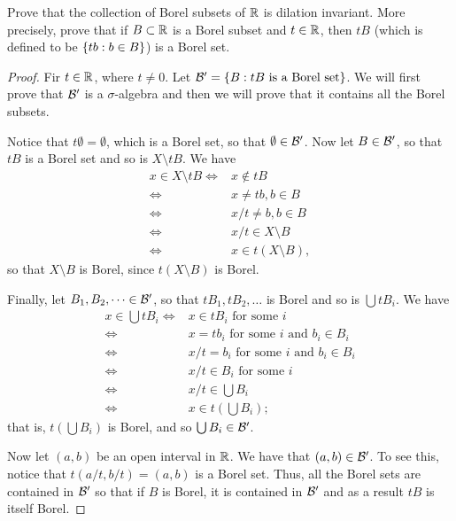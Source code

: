 \begin{exercise}{8}
Prove that the collection of Borel subsets of $\mathbb{R}$ is dilation invariant.
More precisely, prove that if $B \subset \mathbb{R}$ is a Borel subset and $t \in \mathbb{R}$, then $tB$ (which is defined to be $\{tb: b\in B\}$) is a Borel set.
\end{exercise}
\begin{proof}
Fir $t\in\mathbb{R}$, where $t \neq 0$.
Let $\mathcal{B}' = \{B: tB\text{ is a Borel set}\}$.
We will first prove that $\mathcal{B}'$ is a $\sigma$-algebra and then we will prove that it contains all the Borel subsets.

Notice that $t\emptyset = \emptyset$, which is a Borel set, so that $\emptyset \in \mathcal{B}'$.
Now let $B \in \mathcal{B}'$, so that $tB$ is a Borel set and so is $X \setminus tB$.
We have 
\begin{align*}
    x \in X \setminus tB 
    \iff& x \notin tB\\
    \iff& x \neq tb, b\in B\\
    \iff& x/t \neq b, b\in B\\
    \iff& x/t \in X\setminus B\\
    \iff& x \in t(X\setminus B),
\end{align*}
so that $X\setminus B$ is Borel, since $t (X \setminus B)$ is Borel.

Finally, let $B_1,B_2,\dots \in \mathcal{B}'$, so that $tB_1, tB_2,\dots$ is Borel and so is $\bigcup tB_i$.
We have
\begin{align*}
    x \in \bigcup tB_i
    \iff& x \in tB_i \text{ for some $i$}\\
    \iff& x = tb_i \text{ for some $i$ and }b_i \in B_i\\
    \iff& x/t = b_i \text{ for some $i$ and }b_i \in B_i\\
    \iff& x/t \in B_i \text{ for some $i$}\\
    \iff& x/t \in \bigcup B_i\\
    \iff& x \in t(\bigcup B_i);
\end{align*}
that is, $t(\bigcup B_i)$ is Borel, and so $\bigcup B_i \in \mathcal{B}'$.

Now let $(a,b)$ be an open interval in $\mathbb{R}$.
We have that $(a,b) \in \mathcal{B}'$.
To see this, notice that $t(a/t, b/t) = (a,b)$ is a Borel set.
Thus, all the Borel sets are contained in $\mathcal{B}'$ so that if $B$ is Borel, it is contained in $\mathcal{B}'$ and as a result $tB$ is itself Borel.
\end{proof} 

